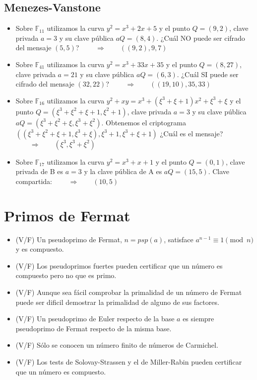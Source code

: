 \documentclass[fleqn]{article}
\def\F{\mathds{F}}
\def\next{\qquad \Rightarrow \qquad}
\begin{document}
    \subsection{Menezes-Vanstone}
    \begin{itemize}
        \item Sobre $\F_{11}$ utilizamos la curva $y^2 = x^3 + 2x + 5$ y el punto $Q = (9,2)$, clave privada $a = 3$ y su clave pública $aQ = (8,4)$. ¿Cuál NO puede ser cifrado del mensaje $(5,5)$? $\next ((9,2), 9, 7)$
        \item Sobre $\F_{41}$ utilizamos la curva $y^2 = x^3 + 33x + 35$ y el punto $Q = (8,27)$, clave privada $a = 21$ y su clave pública $aQ = (6,3)$. ¿Cuál SI puede ser cifrado del mensaje $(32,22)$? $\next ((19,10), 35, 33)$
        \item Sobre $\F_{16}$ utilizamos la curva $y^2 + xy = x^3 + (\xi^3 + \xi + 1)x^2 + \xi^3 + \xi$ y el punto $Q = (\xi^3 + \xi^2 + \xi + 1,\xi^2 + 1)$, clave privada $a = 3$ y su clave pública $aQ = (\xi^3 + \xi^2 + \xi, \xi^3 + \xi^2)$. 
                Obtenemos el criptograma $((\xi^3 + \xi^2 + \xi + 1, \xi^3 + \xi), \xi^3 + 1, \xi^3 + \xi + 1)$ ¿Cuál es el mensaje? $\next (\xi^3, \xi^3 + \xi^2)$
        \item Sobre $\F_{17}$ utilizamos la curva $y^2 = x^3 + x + 1$ y el punto $Q = (0,1)$, clave privada de B es $a = 3$ y la clave pública de A es $aQ = (15,5)$. Clave compartida: $\next (10,5)$
    \end{itemize}

    \section{Primos de Fermat}
    \begin{itemize}
        \item (V/F) Un pseudoprimo de Fermat, $n = psp(a)$, satisface $a^{n-1} \equiv 1 \pmod{n}$ y es compuesto.
        \item (V/F) Los pseudoprimos fuertes pueden certificar que un número es compuesto pero no que es primo.
        \item (V/F) Aunque sea fácil comprobar la primalidad de un número de Fermat puede ser dificil demostrar la primalidad de alguno de sus factores.
        \item (V/F) Un pseudoprimo de Euler respecto de la base $a$ es siempre pseudoprimo de Fermat respecto de la misma base.
        \item (V/F) Sólo se conocen un número ﬁnito de números de Carmichel.
        \item (V/F) Los tests de Solovay-Strassen y el de Miller-Rabin pueden certificar que un número es compuesto.
    \end{itemize}
\end{document}
